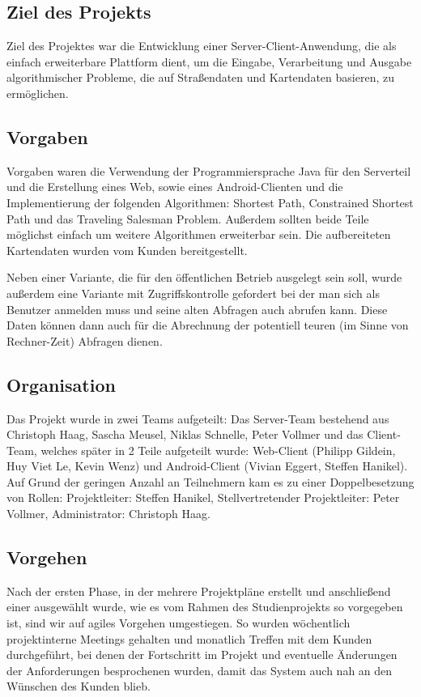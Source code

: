 \subsection*{Ziel des Projekts}

Ziel des Projektes war die Entwicklung einer Server-Client-Anwendung, die als einfach erweiterbare Plattform dient, um die Eingabe, Verarbeitung und Ausgabe algorithmischer Probleme, die auf Straßendaten und Kartendaten basieren, zu ermöglichen.

\subsection*{Vorgaben}

Vorgaben waren die Verwendung der Programmiersprache Java für den Serverteil und die Erstellung eines Web, sowie eines Android-Clienten und die Implementierung der folgenden Algorithmen: Shortest Path, Constrained Shortest Path und das Traveling Salesman Problem. Außerdem sollten beide Teile möglichst einfach um weitere Algorithmen erweiterbar sein. Die aufbereiteten Kartendaten wurden vom Kunden bereitgestellt.

Neben einer Variante, die für den öffentlichen Betrieb ausgelegt sein soll, wurde außerdem eine Variante mit Zugriffskontrolle gefordert bei der man sich als Benutzer anmelden muss und seine alten Abfragen auch abrufen kann. Diese Daten können dann auch für die Abrechnung der potentiell teuren (im Sinne von Rechner-Zeit) Abfragen dienen.

\subsection*{Organisation}

Das Projekt wurde in zwei Teams aufgeteilt: Das Server-Team bestehend aus Christoph Haag, Sascha Meusel, Niklas Schnelle, Peter Vollmer und das Client-Team, welches später in 2 Teile aufgeteilt wurde: Web-Client (Philipp Gildein, Huy Viet Le, Kevin Wenz) und Android-Client (Vivian Eggert, Steffen Hanikel). Auf Grund der geringen Anzahl an Teilnehmern kam es zu einer Doppelbesetzung von Rollen: Projektleiter: Steffen Hanikel, Stellvertretender Projektleiter: Peter Vollmer, Administrator: Christoph Haag.

\subsection*{Vorgehen}

Nach der ersten Phase, in der mehrere Projektpläne erstellt und anschließend einer ausgewählt wurde, wie es vom Rahmen des Studienprojekts so vorgegeben ist, sind wir auf agiles Vorgehen umgestiegen. So wurden wöchentlich projektinterne Meetings gehalten und monatlich Treffen mit dem Kunden durchgeführt, bei denen der Fortschritt im Projekt und eventuelle Änderungen der Anforderungen besprochenen wurden, damit das System auch nah an den Wünschen des Kunden blieb.

